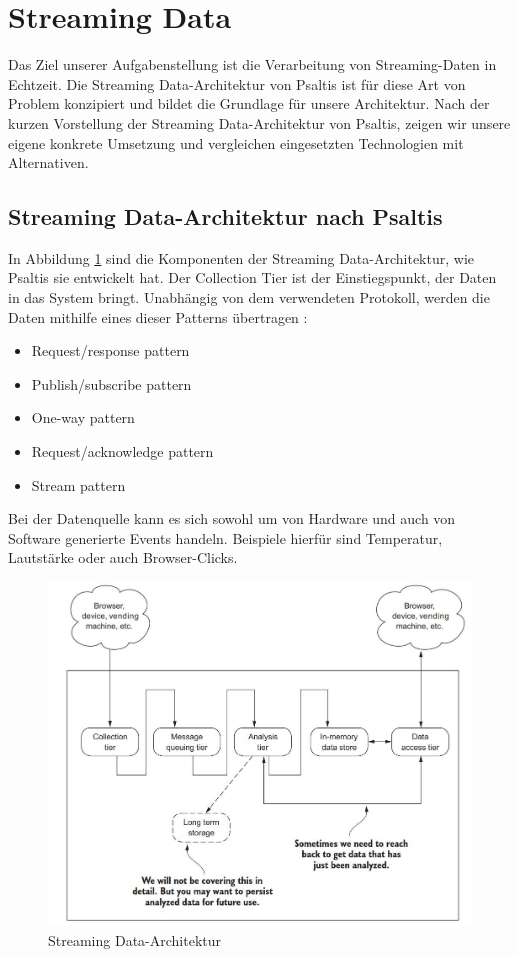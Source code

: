 \section{Streaming Data}

Das Ziel unserer Aufgabenstellung ist die Verarbeitung von Streaming-Daten in Echtzeit. Die Streaming Data-Architektur
von Psaltis \cite{psaltis2017streaming} ist für diese Art von Problem konzipiert und bildet die Grundlage für
unsere Architektur. Nach der kurzen Vorstellung der Streaming Data-Architektur von Psaltis, zeigen wir unsere eigene konkrete
Umsetzung und vergleichen eingesetzten Technologien mit Alternativen.

\subsection{Streaming Data-Architektur nach Psaltis}

In Abbildung \ref{fig:streaming_data_architecture-psaltis} sind die Komponenten der Streaming Data-Architektur, wie Psaltis \cite{psaltis2017streaming}
sie entwickelt hat. Der Collection Tier ist der Einstiegspunkt, der Daten in das System bringt. Unabhängig von dem verwendeten
Protokoll, werden die Daten mithilfe eines dieser Patterns übertragen \cite{psaltis2017streaming}:
\begin{itemize}
    \item Request/response pattern
    \item Publish/subscribe pattern
    \item One-way pattern
    \item Request/acknowledge pattern
    \item Stream pattern
\end{itemize}

Bei der Datenquelle kann es sich sowohl um von Hardware und auch von Software generierte Events handeln. Beispiele hierfür sind
Temperatur, Lautstärke oder auch Browser-Clicks.

\begin{figure}[h]
    \includegraphics[width=.5\textwidth]{images/streaming_data_architecture-psaltis.jpg}
    \caption{Streaming Data-Architektur \cite{psaltis2017streaming}}
    \label{fig:streaming_data_architecture-psaltis}
\end{figure}

